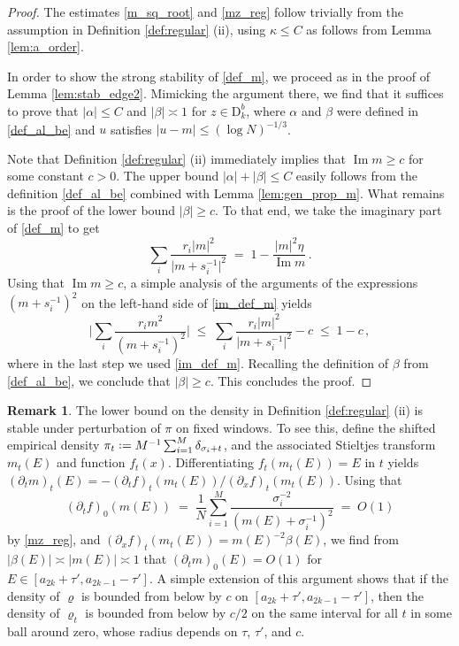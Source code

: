 \documentclass[11pt]{article} %
\numberwithin{equation}{section}
\numberwithin{figure}{section}
\theoremstyle{plain} %
\theoremstyle{definition} %
\newtheorem{remark}[theorem]{Remark}
\newcommand{\f}[1]{\boldsymbol{\mathrm{#1}}} %
\newcommand*{\deq}{\mathrel{\vcenter{\baselineskip0.65ex \lineskiplimit0pt \hbox{.}\hbox{.}}}=}
\renewcommand{\leq}{\leqslant}
\renewcommand{\geq}{\geqslant}
\newcommand{\abs}[1]{\lvert #1 \rvert}
\newcommand{\absBB}[1]{\Biggl\lvert #1 \Biggr\rvert}
\DeclareMathOperator{\im}{Im}
\begin{document}
\begin{proof}
The estimates \eqref{m_sq_root} and \eqref{mz_reg} follow trivially from the assumption in Definition \ref{def:regular} (ii), using $\kappa \leq C$ as follows from Lemma \ref{lem:a_order}.

In order to show the strong stability of \eqref{def_m}, we proceed as in the proof of Lemma \ref{lem:stab_edge2}. Mimicking the argument there, we find that it suffices to prove that $\abs{\alpha} \leq C$ and $\abs{\beta} \asymp 1$ for $z \in \f D^b_k$, where $\alpha$ and $\beta$ were defined in \eqref{def_al_be} and $u$ satisfies $\abs{u - m} \leq (\log N)^{-1/3}$.

Note that Definition \ref{def:regular} (ii) immediately implies that $\im m \geq c$ for some constant $c > 0$.
The upper bound $\abs{\alpha} + \abs{\beta} \leq C$ easily follows from the definition \eqref{def_al_be} combined with Lemma \ref{lem:gen_prop_m}.  What remains is the proof of the lower bound $\abs{\beta} \geq c$. To that end, we take the imaginary part of \eqref{def_m} to get
\begin{equation} \label{im_def_m}
\sum_i \frac{r_i \abs{m}^2}{\abs{m + s_i^{-1}}^2} \;=\; 1 - \frac{\abs{m}^2 \eta}{\im m}\,.
\end{equation}
Using that $\im m \geq c$, a simple analysis of the arguments of the expressions $(m + s_i^{-1})^2$ on the left-hand side of \eqref{im_def_m} yields
\begin{equation*}
\absBB{\sum_i \frac{r_i m^2}{(m + s_i^{-1})^2}} \;\leq\; \sum_i \frac{r_i \abs{m}^2}{\abs{m + s_i^{-1}}^2} - c \;\leq\; 1 - c\,,
\end{equation*}
where in the last step we used \eqref{im_def_m}. Recalling the definition of $\beta$ from \eqref{def_al_be}, we conclude that $\abs{\beta} \geq c$. This concludes the proof.
\end{proof}

\begin{remark} \label{rem:bulk_stab}
The lower bound on the density in Definition \ref{def:regular} (ii) is stable under perturbation of $\pi$ on fixed windows. To see this, define the shifted empirical density $\pi_t \deq M^{-1} \sum_{i = 1}^M \delta_{\sigma_i + t}$, and the associated Stieltjes transform $m_t(E)$ and function $f_t(x)$. Differentiating $f_t(m_t(E)) = E$ in $t$ yields $(\partial_t m)_t(E) = - (\partial_t f)_t(m_t(E)) / (\partial_x f)_t(m_t(E))$. Using that
\begin{equation*}
(\partial_t f)_0(m(E)) \;=\; \frac{1}{N} \sum_{i = 1}^M \frac{\sigma_i^{-2}}{(m(E) + \sigma_i^{-1})^2} \;=\; O(1)
\end{equation*}
by \eqref{mz_reg}, and $(\partial_x f)_t(m_t(E)) = m(E)^{-2} \beta(E)$, we find from $\abs{\beta(E)} \asymp \abs{m(E)} \asymp 1$ that $(\partial_t m)_0(E) = O(1)$ for $E \in [a_{2k} + \tau', a_{2k - 1} - \tau']$. A simple extension of this argument shows that if the density of $\varrho$ is bounded from below by $c$ on $[a_{2k} + \tau', a_{2k - 1} - \tau']$, then the density of $\varrho_t$ is bounded from below by $c/2$ on the same interval for all $t$ in some ball around zero, whose radius depends on $\tau$, $\tau'$, and $c$.
\end{remark}
\end{document}
